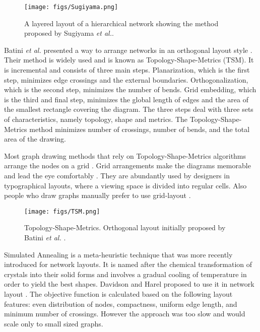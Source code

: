 \documentclass[a4paper,11pt,phdthesis,singlespace,twoside]{cssethesis}
\begin{document}
\begin{figure}
\begin{center}
\texttt{[image: figs/Sugiyama.png]}
\end{center}
\caption{A layered layout of a hierarchical network showing the method proposed by Sugiyama \emph{et al.}\cite{sugiyama1981methods}.}
\label{fig:Sugiyama}
\end{figure}

Batini \emph{et al.} presented a way to arrange networks in an orthogonal layout style \cite{batini1986layout}. Their method is widely used and is known as Topology-Shape-Metrics (TSM). It is incremental and consists of three main steps. Planarization, which is the first step, minimizes edge crossings and the external boundaries. Orthogonalization, which is the second step, minimizes the number of bends. Grid embedding, which is the third and final step, minimizes the global length of edges and the area of the smallest rectangle covering the diagram. The three steps deal with three sets of characteristics, namely topology, shape and metrics. The Topology-Shape-Metrics method minimizes number of crossings, number of bends, and the total area of the drawing.

Most graph drawing methods that rely on Topology-Shape-Metrics algorithms arrange the nodes on a grid \cite{kieffer2015hola}\cite{batini1986layout}. Grid arrangements make the diagrams memorable\cite{marriott2012memorability} and lead the eye comfortably \cite{brockmann1981grid}. They are abundantly used by designers in typographical layouts, where a viewing space is divided into regular cells. Also people who draw graphs manually prefer to use grid-layout \cite{purchase2012graph}.

\begin{figure}
\begin{center}
\texttt{[image: figs/TSM.png]}
\end{center}
\caption{Topology-Shape-Metrics. Orthogonal layout initially proposed by Batini \emph{et al.} \cite{bertolazzi2000computing}.}
\label{fig:TSM}
\end{figure}

Simulated Annealing \cite{gendreau2010handbook} is a meta-heuristic technique that was more recently introduced for network layouts. It is named after the chemical transformation of crystals into their solid forms and involves a gradual cooling of temperature in order to yield the best shapes. Davidson and Harel proposed to use it in network layout \cite{davidson1996drawing}. The objective function is calculated based on the following layout features: even distribution of nodes, compactness, uniform edge length, and minimum number of crossings. However the approach was too slow and would scale only to small sized graphs.
\end{document}
